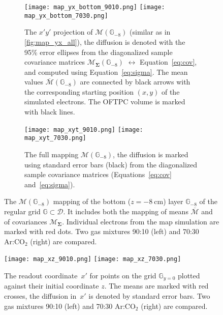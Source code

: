 		\begin{figure}
			\centering
			\begin{subfigure}[t]{\textwidth}
				\centering
				\texttt{[image: map\_yx\_bottom\_9010.png]}
				\hfill
				\texttt{[image: map\_yx\_bottom\_7030.png]}
				\caption{The $x'y'$ projection of $\mathcal{M}(\mathbb{G}_{-8})$ (similar as in \cref{fig:map_yx_all}), the diffusion is denoted with the 95\% error ellipses from  the diagonalized sample covariance matrices $\mathcal{M}_\mathbf{\Sigma}(\mathbb{G}_{-8})$ $\leftrightarrow$ Equation~\ref{eq:cov}, and computed using Equation~\ref{eq:sigma}. The mean values $\overline{\mathcal{M}}(\mathbb{G}_{-8})$ are connected by black arrows with the corresponding starting position $(x,y)$ of the simulated electrons. The \ac{OFTPC} volume is marked with black lines.}
				\label{fig:map_yx_bot}
			\end{subfigure}
			
			\begin{subfigure}[t]{\textwidth}
				\centering
				\texttt{[image: map\_xyt\_9010.png]}
				\hfill
				\texttt{[image: map\_xyt\_7030.png]}
				\caption{The full mapping $\mathcal{M}(\mathbb{G}_{-8})$, the diffusion is marked using standard error bars (black) from the diagonalized sample covariance matrices (Equations~\ref{eq:cov} and~\ref{eq:sigma}).}
				\label{fig:map_xyt}
			\end{subfigure}
			\caption{The $\mathcal{M}(\mathbb{G}_{-8})$ mapping of the bottom ($z = \SI{-8}{\centi\meter}$) layer $\mathbb{G}_{-8}$ of the regular grid $\mathbb{G}\subset\mathcal{D}$. It includes both the mapping of means $\overline{\mathcal{M}}$ and of covariances $\mathcal{M}_\mathbf{\Sigma}$. Individual electrons from the map simulation are marked with red dots. Two gas mixtures 90:10 (left) and 70:30 Ar:CO$_2$ (right) are compared.}
			\label{fig:map_bot}
		\end{figure}
		
		\begin{figure}
			\centering
			\texttt{[image: map\_xz\_9010.png]}
			\hfill
			\texttt{[image: map\_xz\_7030.png]}
			\caption{The readout coordinate~$x'$ for points on the grid $\mathbb{G}_{y=0}$ plotted against their initial coordinate $z$. The means are marked with red crosses, the diffusion in~$x'$ is denoted by standard error bars. Two gas mixtures 90:10 (left) and 70:30 Ar:CO$_2$ (right) are compared.}
			\label{fig:map_xz}
		\end{figure}
		
